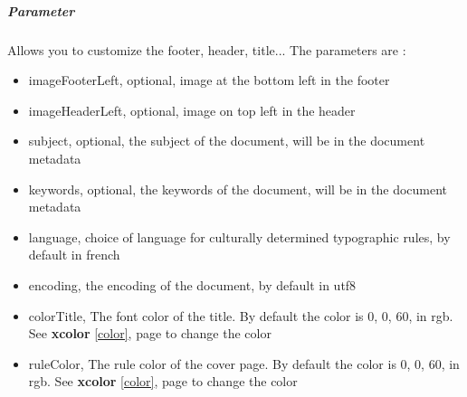 \subparagraph{Parameter}
Allows you to customize the footer, header, title...
The parameters are :
\begin{itemize}
    \item imageFooterLeft, optional, image at the bottom left in the footer
    \item imageHeaderLeft, optional, image on top left in the header
    \item subject, optional, the subject of the document, will be in the document metadata
    \item keywords, optional, the keywords of the document, will be in the document metadata
    \item language, choice of language for culturally determined typographic rules, by default in french
    \item encoding, the encoding of the document, by default in utf8
    \item colorTitle, The font color of the title. By default the color is 0, 0, 60, in rgb. See \textbf{xcolor} \ref{color}, page \pageref{color} to change the color
    \item ruleColor, The rule color of the cover page. By default the color is 0, 0, 60, in rgb. See \textbf{xcolor} \ref{color}, page \pageref{color} to change the color
\end{itemize}

